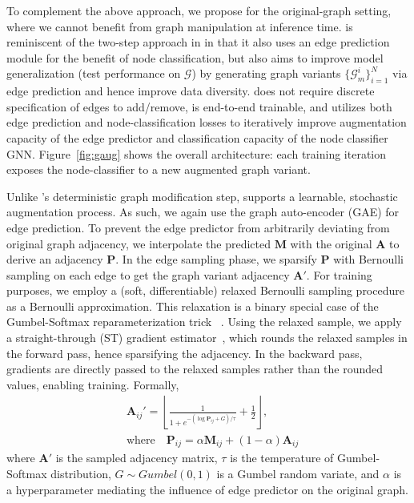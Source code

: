 \documentclass[letterpaper]{article} \usepackage{aaai21}  \usepackage{times}  \usepackage{helvet} \usepackage{courier}  \usepackage[hyphens]{url}  \usepackage{graphicx} \urlstyle{rm} \def\UrlFont{\rm}  \usepackage{natbib}  \usepackage{caption} \frenchspacing  \setlength{\pdfpagewidth}{8.5in}  \setlength{\pdfpageheight}{11in}
\begin{document}
To complement the above approach, we propose \method for the original-graph setting, where we cannot benefit from graph manipulation at inference time.  \method is reminiscent of the two-step approach in \methodshared in that it also uses an edge prediction module for the benefit of node classification, but also aims to improve model generalization (test performance on $\mathcal{G}$) by generating graph variants $\{\mathcal{G}^i_m\}_{i=1}^N$ via edge prediction and hence improve data diversity.  \method does not require discrete specification of edges to add/remove, is end-to-end trainable, and utilizes both edge prediction and node-classification losses to iteratively improve augmentation capacity of the edge predictor and classification capacity of the node classifier GNN.  Figure~\ref{fig:gaug} shows the overall architecture: each training iteration exposes the node-classifier to a new augmented graph variant.







Unlike \methodtwo's deterministic graph modification step, \method supports a learnable, stochastic augmentation process. As such, we again use the graph auto-encoder (GAE) for edge prediction.  To prevent the edge predictor from arbitrarily deviating from original graph adjacency, we interpolate the predicted  $\mathbf{M}$ with the original $\mathbf{A}$ to derive an adjacency $\mathbf{P}$.  In the edge sampling phase, we sparsify $\mathbf{P}$ with Bernoulli sampling on each edge to get the graph variant adjacency $\mathbf{A}'$. For training purposes, we employ a (soft, differentiable) relaxed Bernoulli sampling procedure as a Bernoulli approximation. This relaxation is a binary special case of the Gumbel-Softmax reparameterization trick ~\cite{maddison2016concrete, jang2016categorical}.  Using the relaxed  sample, we apply a straight-through (ST) gradient estimator~\cite{bengio2013estimating}, which rounds the relaxed samples in the forward pass, hence sparsifying the adjacency. In the backward pass, gradients are directly passed to the relaxed samples rather than the rounded values, enabling training. Formally, 
\begin{equation}
\begin{aligned}
    &\mathbf{A}_{ij}' = \left\lfloor \frac{1}{1 + e^{-(\log \mathbf{P}_{ij} + G) / \tau}} + \frac{1}{2} \right\rfloor,  \\ 
    & \mbox{where} \quad \mathbf{P}_{ij} = \alpha \mathbf{M}_{ij} + (1-\alpha)\mathbf{A}_{ij} 
\end{aligned}
\end{equation}
where $\mathbf{A}'$ is the sampled adjacency matrix, $\tau$ is the temperature of Gumbel-Softmax distribution, $G \sim Gumbel(0,1)$ is a Gumbel random variate, and $\alpha$ is a hyperparameter mediating the influence of edge predictor on the original graph. 
\end{document}
